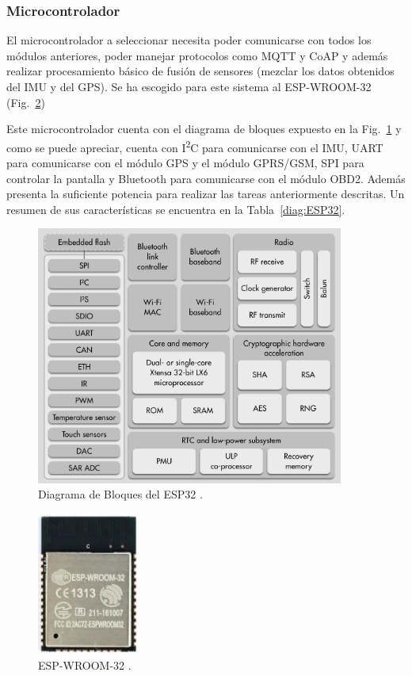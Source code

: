 \subsubsection{Microcontrolador}
El microcontrolador a seleccionar necesita poder comunicarse con todos los módulos anteriores, poder manejar protocolos como MQTT y CoAP y además realizar procesamiento básico de fusión de sensores (mezclar los datos obtenidos del IMU y del GPS). Se ha escogido para este sistema al ESP-WROOM-32 (Fig.~\ref{fig:esp-wroom32})

Este microcontrolador cuenta con el diagrama de bloques expuesto en la Fig.~\ref{fig:Bloques_esp32} y como se puede apreciar, cuenta con I\textsuperscript{2}C para comunicarse con el IMU, UART para comunicarse con el módulo GPS y el módulo GPRS/GSM, SPI para controlar la pantalla y Bluetooth para comunicarse con el módulo OBD2. Además presenta la suficiente potencia para realizar las tareas anteriormente descritas. Un resumen de sus características se encuentra en la Tabla~\ref{diag:ESP32}.

\begin{figure}[hbtp!]
\centering
\includegraphics[width=0.9\textwidth]{ESP32_Function_Block_Diagram.jpg}
\caption{Diagrama de Bloques del ESP32  \cite{Esp32}.}
\label{fig:Bloques_esp32}
\end{figure}


\begin{figure}[hbtp!]
\centering
\includegraphics[width=0.3\textwidth]{esp32.jpg}
\caption{ESP-WROOM-32 \cite{ESP32_page}.}
\label{fig:esp-wroom32}
\end{figure}

